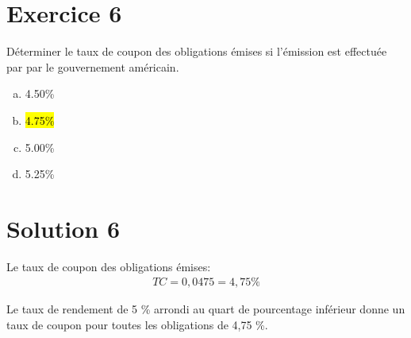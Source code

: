 \documentclass[10pt,a4paper]{article}
\begin{document}
\newpage

\section*{Exercice 6}
Déterminer le taux de coupon des obligations émises si l'émission est effectuée par par le gouvernement américain.

\begin{enumerate}[a)]
\item 4.50\%
\item \hl{4.75\%}
\item 5.00\%
\item 5.25\%
\end{enumerate}

\section*{Solution 6}
Le taux de coupon des obligations émises:
\begin{align*}
TC  = 0,0475 = 4,75 \%
\end{align*}

Le taux de rendement de 5 \% arrondi au quart de pourcentage inférieur donne un taux de coupon pour toutes les obligations de 4,75 \%.
\end{document}

